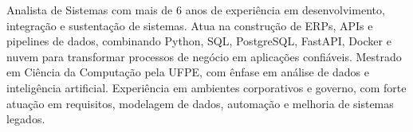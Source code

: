 {\color{cvmuted}
Analista de Sistemas com mais de 6 anos de experiência em desenvolvimento, integração e sustentação de sistemas. Atua na construção de ERPs, APIs e pipelines de dados, combinando Python, SQL, PostgreSQL, FastAPI, Docker e nuvem para transformar processos de negócio em aplicações confiáveis. Mestrado em Ciência da Computação pela UFPE, com ênfase em análise de dados e inteligência artificial. Experiência em ambientes corporativos e governo, com forte atuação em requisitos, modelagem de dados, automação e melhoria de sistemas legados.
}
